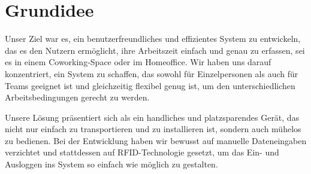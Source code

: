 \documentclass[../main.tex]{subfiles}
\begin{document}
\section{Grundidee}
Unser Ziel war es, ein benutzerfreundliches und effizientes System zu entwickeln, das es den Nutzern ermöglicht, ihre Arbeitszeit einfach und genau zu erfassen, sei es in einem Coworking-Space oder im Homeoffice. Wir haben uns darauf konzentriert, ein System zu schaffen, das sowohl für Einzelpersonen als auch für Teams geeignet ist und gleichzeitig flexibel genug ist, um den unterschiedlichen Arbeitsbedingungen gerecht zu werden.

\noindent Unsere Lösung präsentiert sich als ein handliches und platzsparendes Gerät, das nicht nur einfach zu transportieren und zu installieren ist, sondern auch mühelos zu bedienen. Bei der Entwicklung haben wir bewusst auf manuelle Dateneingaben verzichtet und stattdessen auf RFID-Technologie gesetzt, um das Ein- und Ausloggen ins System so einfach wie möglich zu gestalten.
\end{document}

